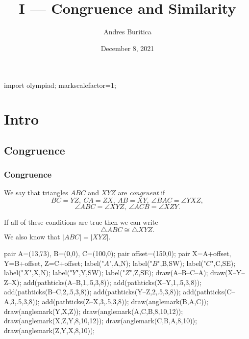 \documentclass{beamer}
\title{I --- Congruence and Similarity}
\author{Andres Buritica}
\date{December 8, 2021}
\begin{document}
\begin{asydef}
  import olympiad;
  markscalefactor=1;
\end{asydef}
\begin{frame}[fragile]
  \titlepage{}
\end{frame}
\section{Intro}
  \subsection{Congruence}
    \begin{frame}[fragile]
      \frametitle{Congruence}
      We say that triangles $ABC$ and $XYZ$ are \emph{congruent} if \[BC=YZ,\ CA=ZX,\
      AB=XY,\ \angle BAC=\angle YXZ,\]
      \[\angle ABC=\angle XYZ,\ \angle ACB=\angle XZY.\]

      If all of these conditions are true then we can write \[\triangle
      ABC\cong\triangle XYZ.\] We also know that $|ABC| = |XYZ|$.
      
      \begin{center}
        \begin{asy}
          pair A=(13,73), B=(0,0), C=(100,0);
          pair offset=(150,0);
          pair X=A+offset, Y=B+offset, Z=C+offset;
          label("$A$",A,N);
          label("$B$",B,SW);
          label("$C$",C,SE);
          label("$X$",X,N);
          label("$Y$",Y,SW);
          label("$Z$",Z,SE);
          draw(A--B--C--A);
          draw(X--Y--Z--X);
          add(pathticks(A--B,1,.5,3,8));
          add(pathticks(X--Y,1,.5,3,8));
          add(pathticks(B--C,2,.5,3,8));
          add(pathticks(Y--Z,2,.5,3,8));
          add(pathticks(C--A,3,.5,3,8));
          add(pathticks(Z--X,3,.5,3,8));
          draw(anglemark(B,A,C));
          draw(anglemark(Y,X,Z));
          draw(anglemark(A,C,B,8,10,12));
          draw(anglemark(X,Z,Y,8,10,12));
          draw(anglemark(C,B,A,8,10));
          draw(anglemark(Z,Y,X,8,10));
        \end{asy}
      \end{center}
    \end{frame}
\end{document}
